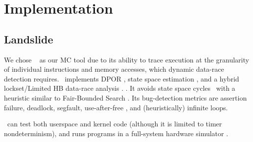 \section{Implementation}
\label{sec:implementation}

\subsection{Landslide}
\label{sec:landslide}

We chose \landslide~\cite{landslide} as our MC tool due to its ability to trace execution at the granularity of individual instructions and memory accesses, which dynamic data-race detection requires.
\landslide~implements DPOR \cite{dpor},
state space estimation \cite{estimation},
and a hybrid
lockset/Limited HB
data-race analysis \cite{hybriddatarace}.
\revision{It can optionally replace DPOR with ICB \cite{chess-icb},
for which it uses Bounded Partial Order Reduction \cite{bpor} for a similar reduction,
though \quicksand~does not employ this feature (\sect{\ref{sec:future}})}.
It avoids state space cycles
~with
a heuristic similar to Fair-Bounded Search \cite{bpor}.
Its bug-detection metrics are assertion failure, deadlock, segfault, use-after-free \cite{valgrind}, and (heuristically) infinite loops.

\revision{\landslide}~can test both userspace and kernel code (although it is limited to timer nondeterminism),
and runs programs in a full-system hardware simulator \cite{simics}.


